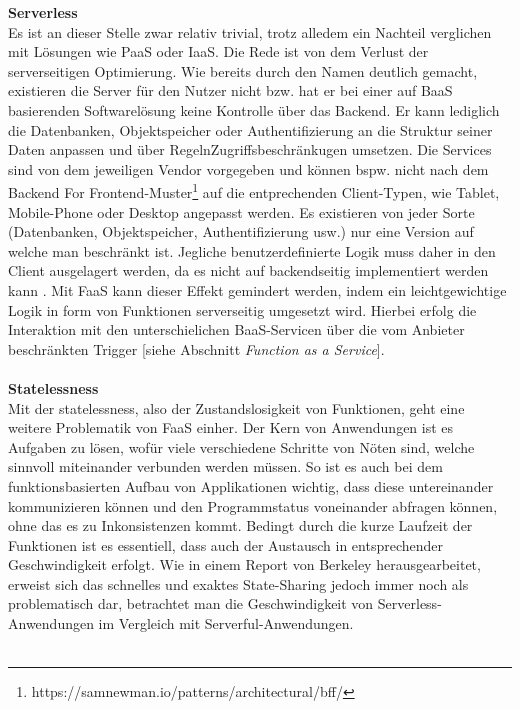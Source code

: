 \documentclass[11pt]{article}
\begin{document}
\glqq \textbf{Serverless}\grqq{}\\
Es ist an dieser Stelle zwar relativ trivial, trotz alledem ein Nachteil verglichen mit Lösungen wie PaaS oder IaaS. Die Rede ist von dem Verlust der serverseitigen Optimierung. Wie bereits durch den Namen deutlich gemacht, existieren die Server für den Nutzer nicht bzw. hat er bei einer auf BaaS basierenden Softwarelösung keine Kontrolle über das Backend. Er kann lediglich die Datenbanken, Objektspeicher oder Authentifizierung an die Struktur seiner Daten anpassen und über \glqq Regeln\grqq{}Zugriffsbeschränkugen umsetzen. Die Services sind von dem jeweiligen Vendor vorgegeben und können bspw. nicht nach dem \glqq Backend For Frontend\grqq{}-Muster\footnote{https://samnewman.io/patterns/architectural/bff/} auf die entprechenden Client-Typen, wie Tablet, Mobile-Phone oder Desktop angepasst werden. Es existieren von jeder Sorte (Datenbanken, Objektspeicher, Authentifizierung usw.) nur eine Version auf welche man beschränkt ist. Jegliche benutzerdefinierte Logik muss daher in den Client ausgelagert werden, da es nicht auf backendseitig implementiert werden kann \cite{fowler2018serverless}. Mit FaaS kann dieser Effekt gemindert werden, indem ein leichtgewichtige Logik in form von Funktionen serverseitig umgesetzt wird. Hierbei erfolg die Interaktion mit den unterschielichen BaaS-Servicen über die vom Anbieter beschränkten Trigger [siehe Abschnitt \textit{Function as a Service}].\\\\
\glqq \textbf{Statelessness}\grqq{}\\
Mit der \glqq statelessness\grqq{}, also der Zustandslosigkeit von Funktionen, geht eine weitere Problematik von FaaS einher. Der Kern von Anwendungen ist es Aufgaben zu lösen, wofür viele verschiedene Schritte von Nöten sind, welche sinnvoll miteinander verbunden werden müssen. So ist es auch bei dem funktionsbasierten Aufbau von Applikationen wichtig, dass diese untereinander kommunizieren können und den Programmstatus voneinander abfragen können, ohne das es zu Inkonsistenzen kommt. Bedingt durch die kurze Laufzeit der Funktionen ist es essentiell, dass auch der Austausch in entsprechender Geschwindigkeit erfolgt. Wie in einem Report von Berkeley \cite{jonas2019cloud} herausgearbeitet, erweist sich das schnelles und exaktes \glqq State-Sharing\grqq{} jedoch immer noch als problematisch dar, betrachtet man die Geschwindigkeit von \glqq Serverless\grqq{}-Anwendungen im Vergleich mit \glqq Serverful\grqq{}-Anwendungen.\\\\
\end{document}
